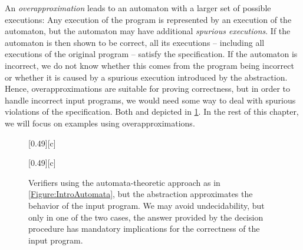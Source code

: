 \documentclass[../../diss.tex]{subfiles}
\begin{document}
An \emph{overapproximation} leads to an automaton with a larger set of possible executions:
Any execution of the program is represented by an execution of the automaton, but the automaton may have additional \emph{spurious executions}.
If the automaton is then shown to be correct, all its executions -- including all executions of the original program -- satisfy the specification.
If the automaton is incorrect, we do not know whether this comes from the program being incorrect or whether it is caused by a spurious execution introduced by the abstraction.
Hence, overapproximations are suitable for proving correctness, but in order to handle incorrect input programs, we would need some way to deal with spurious violations of the specification.
Both  and  depicted in \cref{Figure:IntroAutomataApproximation}.
In the rest of this chapter, we will focus on examples using overapproximations.

\begin{figure}[t]
    {%
        \centering
        [0.49\textwidth][c]
        {%
            \scalebox{0.75}
            {%
                
            }
        }
    }
    {%
        \centering
        [0.49\textwidth][c]
        {%
            \scalebox{0.75}
            {%
                
            }
        }
    }
    \caption{%
        Verifiers using the automata-theoretic approach as in \cref{Figure:IntroAutomata}, but the abstraction approximates the behavior of the input program.
        We may avoid undecidability, but only in one of the two cases, the answer provided by the decision procedure has mandatory implications for the correctness of the input program.
    }%
    \label{Figure:IntroAutomataApproximation}
\end{figure}
\end{document}
